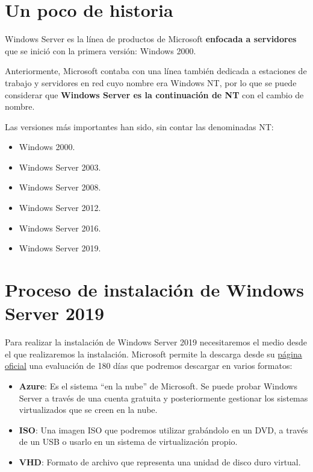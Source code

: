 \chapter{Un poco de historia}

Windows Server es la línea de productos de Microsoft \textbf{enfocada a servidores} que se inició con la primera versión: Windows 2000.

Anteriormente, Microsoft contaba con una línea también dedicada a estaciones de trabajo y servidores en red cuyo nombre era Windows NT, por lo que se puede considerar que \textbf{Windows Server es la continuación de NT} con el cambio de nombre.

Las versiones más importantes han sido, sin contar las denominadas NT:
\begin{itemize}
    \item Windows 2000.
    \item Windows Server 2003.
    \item Windows Server 2008.
    \item Windows Server 2012.
    \item Windows Server 2016.
    \item Windows Server 2019.
\end{itemize}

\chapter{Proceso de instalación de Windows Server 2019}
Para realizar la instalación de Windows Server 2019 necesitaremos el medio desde el que realizaremos la instalación. Microsoft permite la descarga desde su \href{https://www.microsoft.com/es-es/evalcenter/evaluate-windows-server-2019}{página oficial} una evaluación de 180 días que podremos descargar en varios formatos:

\begin{itemize}
    \item \textbf{Azure}: Es el sistema “en la nube” de Microsoft. Se puede probar Windows Server a través de una cuenta gratuita y posteriormente gestionar los sistemas virtualizados que se creen en la nube.
    \item \textbf{ISO}: Una imagen ISO que podremos utilizar grabándolo en un DVD, a través de un USB o usarlo en un sistema de virtualización propio.
    \item \textbf{VHD}: Formato de archivo que representa una unidad de disco duro virtual.
\end{itemize}


